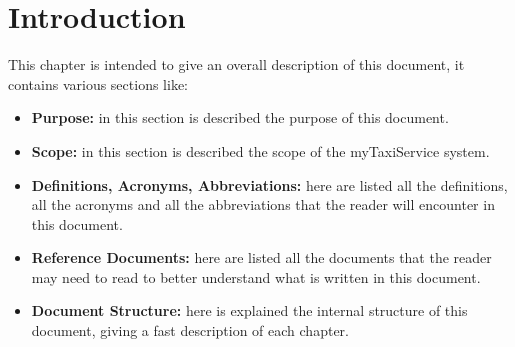 \documentclass[../../dd.tex]{subfiles}
\begin{document}
	\chapter{Introduction}
		This chapter is intended to give an overall description of this document, it contains various sections like:
		\begin{itemize}
			\item \textbf{Purpose:} in this section is described the purpose of this document.
			\item \textbf{Scope:} in this section is described the scope of the myTaxiService system.
			\item \textbf{Definitions, Acronyms, Abbreviations:} here are listed all the definitions, all the acronyms and all the abbreviations that the reader will encounter in this document.
			\item \textbf{Reference Documents:} here are listed all the documents that the reader may need to read to better understand what is written in this document.
			\item \textbf{Document Structure:} here is explained the internal structure of this document, giving a fast description of each chapter.
		\end{itemize}

	

	

	

	

	
\end{document}
